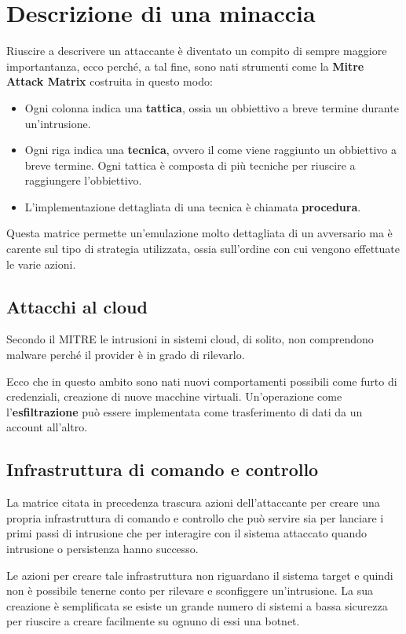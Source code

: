 \chapter{Descrizione di una minaccia}
Riuscire a descrivere un attaccante è diventato un compito di sempre maggiore importantanza, ecco perché, a tal fine,
sono nati strumenti come la \textbf{Mitre Attack Matrix} costruita in questo modo:
\begin{itemize}
	\item Ogni colonna indica una \textbf{tattica}, ossia un obbiettivo a breve termine durante un'intrusione.
	\item Ogni riga indica una \textbf{tecnica}, ovvero il come viene raggiunto un obbiettivo a breve termine. Ogni
	      tattica è composta di più tecniche per riuscire a raggiungere l'obbiettivo.
	\item L'implementazione dettagliata di una tecnica è chiamata \textbf{procedura}.
\end{itemize}
Questa matrice permette un'emulazione molto dettagliata di un avversario ma è carente sul tipo di strategia utilizzata,
ossia sull'ordine con cui vengono effettuate le varie azioni.

\section{Attacchi al cloud}
Secondo il MITRE le intrusioni in sistemi cloud, di solito, non comprendono malware perché il provider è in grado di
rilevarlo.

Ecco che in questo ambito sono nati nuovi comportamenti possibili come furto di credenziali, creazione di nuove
macchine virtuali. Un'operazione come l'\textbf{esfiltrazione} può essere implementata come trasferimento di dati
da un account all'altro.

\section{Infrastruttura di comando e controllo}
La matrice citata in precedenza trascura azioni dell'attaccante per creare una propria infrastruttura di comando e
controllo che può servire sia per lanciare i primi passi di intrusione che per interagire con il sistema attaccato
quando intrusione o persistenza hanno successo.

Le azioni per creare tale infrastruttura non riguardano il sistema target e quindi non è possibile tenerne conto per
rilevare e sconfiggere un'intrusione. La sua creazione è semplificata se esiste un grande numero di sistemi a bassa
sicurezza per riuscire a creare facilmente su ognuno di essi una botnet.